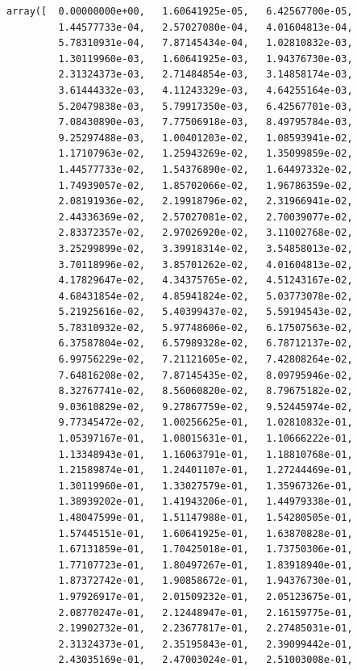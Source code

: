 \documentclass[11pt]{article}
\begin{document}
\begin{verbatim}
array([  0.00000000e+00,   1.60641925e-05,   6.42567700e-05,
         1.44577733e-04,   2.57027080e-04,   4.01604813e-04,
         5.78310931e-04,   7.87145434e-04,   1.02810832e-03,
         1.30119960e-03,   1.60641925e-03,   1.94376730e-03,
         2.31324373e-03,   2.71484854e-03,   3.14858174e-03,
         3.61444332e-03,   4.11243329e-03,   4.64255164e-03,
         5.20479838e-03,   5.79917350e-03,   6.42567701e-03,
         7.08430890e-03,   7.77506918e-03,   8.49795784e-03,
         9.25297488e-03,   1.00401203e-02,   1.08593941e-02,
         1.17107963e-02,   1.25943269e-02,   1.35099859e-02,
         1.44577733e-02,   1.54376890e-02,   1.64497332e-02,
         1.74939057e-02,   1.85702066e-02,   1.96786359e-02,
         2.08191936e-02,   2.19918796e-02,   2.31966941e-02,
         2.44336369e-02,   2.57027081e-02,   2.70039077e-02,
         2.83372357e-02,   2.97026920e-02,   3.11002768e-02,
         3.25299899e-02,   3.39918314e-02,   3.54858013e-02,
         3.70118996e-02,   3.85701262e-02,   4.01604813e-02,
         4.17829647e-02,   4.34375765e-02,   4.51243167e-02,
         4.68431854e-02,   4.85941824e-02,   5.03773078e-02,
         5.21925616e-02,   5.40399437e-02,   5.59194543e-02,
         5.78310932e-02,   5.97748606e-02,   6.17507563e-02,
         6.37587804e-02,   6.57989328e-02,   6.78712137e-02,
         6.99756229e-02,   7.21121605e-02,   7.42808264e-02,
         7.64816208e-02,   7.87145435e-02,   8.09795946e-02,
         8.32767741e-02,   8.56060820e-02,   8.79675182e-02,
         9.03610829e-02,   9.27867759e-02,   9.52445974e-02,
         9.77345472e-02,   1.00256625e-01,   1.02810832e-01,
         1.05397167e-01,   1.08015631e-01,   1.10666222e-01,
         1.13348943e-01,   1.16063791e-01,   1.18810768e-01,
         1.21589874e-01,   1.24401107e-01,   1.27244469e-01,
         1.30119960e-01,   1.33027579e-01,   1.35967326e-01,
         1.38939202e-01,   1.41943206e-01,   1.44979338e-01,
         1.48047599e-01,   1.51147988e-01,   1.54280505e-01,
         1.57445151e-01,   1.60641925e-01,   1.63870828e-01,
         1.67131859e-01,   1.70425018e-01,   1.73750306e-01,
         1.77107723e-01,   1.80497267e-01,   1.83918940e-01,
         1.87372742e-01,   1.90858672e-01,   1.94376730e-01,
         1.97926917e-01,   2.01509232e-01,   2.05123675e-01,
         2.08770247e-01,   2.12448947e-01,   2.16159775e-01,
         2.19902732e-01,   2.23677817e-01,   2.27485031e-01,
         2.31324373e-01,   2.35195843e-01,   2.39099442e-01,
         2.43035169e-01,   2.47003024e-01,   2.51003008e-01,

\end{verbatim}
\end{document}

